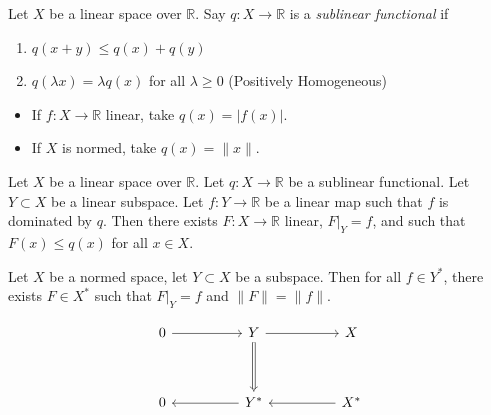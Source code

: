 
\begin{definition}
	\label{defn:SublinearFunctional}
	Let $X$ be a linear space over $\mathbb{R}$. Say $q: X \to \mathbb{R} $ is a \textit{sublinear functional} if
	\begin{enumerate}
		\item $q(x + y) \le q(x) + q(y)$ 
		\item $q ( \lambda x) = \lambda q(x)$ for all $\lambda \ge 0$ (Positively Homogeneous)
	\end{enumerate}
\end{definition}
\begin{example}
	\begin{itemize}
		\item If $f: X \to \mathbb{R}$ linear, take $q(x) = |f(x)|$.
		\item If $X$ is normed, take $q(x) = \|x\|$.
	\end{itemize}
\end{example}

\begin{theorem}
	\label{thm:HahnBanachThm}
	Let $X$ be a linear space over $\mathbb{R}$. Let $q: X \to \mathbb{R}$ be a sublinear functional. Let $Y \subset X$ be a linear subspace. Let $f: Y \to \mathbb{R}$ be a linear map such that $f$ is dominated by $q$. Then there exists $F: X \to \mathbb{R}$ linear, $F|_Y = f$, and such that $F(x) \le q(x)$ for all $x \in X$.
\end{theorem}

\begin{corollary}
	Let $X$ be a normed space, let $Y \subset X$ be a subspace. Then for all $f \in Y^*$, there exists $F\in X^*$ such that $F|_Y = f$ and $\|F\| = \|f\|$.
\end{corollary}

\[\begin{tikzcd}
	0 && Y && X \\
	\\
	0 && {Y^*} && {X^*}
	\arrow[from=1-1, to=1-3]
	\arrow[from=1-3, to=1-5]
	\arrow[Rightarrow, from=1-3, to=3-3]
	\arrow[from=3-5, to=3-3]
	\arrow[from=3-3, to=3-1]
\end{tikzcd}\]

